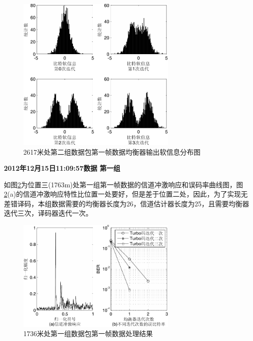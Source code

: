 \begin{figure}[htb]
  \begin{center}
    \includegraphics[width=0.7\textwidth]{images/softInfo_2_2.pdf}
  \end{center}
  \caption{2617米处第二组数据包第一帧数据均衡器输出软信息分布图}
  \label{fig:6.12s}
\end{figure}
\textbf{\sihao 2012年12月15日11:09:57数据 第一组} 

如图\ref{fig:6.13}为位置三(1763m)处第一组第一帧数据的信道冲激响应和误码率曲线图，图\ref{fig:6.13}(a)的信道冲激响应特性比位置一处要好，但是差于位置二处，因此，为了实现无差错译码，本组数据需要的均衡器长度为26，信道估计器长度为25，且需要均衡器迭代三次，译码器迭代一次。

\begin{figure}[htb]
  \begin{center}
    \includegraphics[width=0.7\textwidth]{images/result_3_1_s.pdf}
  \end{center}
  \caption{1736米处第一组数据包第一帧数据处理结果}
  \label{fig:6.13}
\end{figure}

